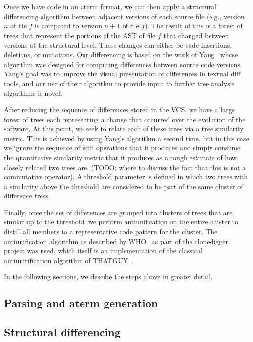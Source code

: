 \documentclass{acm_proc_article-sp}
\begin{document}
Once we have code in an aterm format, we can then apply a structural
differencing algorithm between adjacent versions of each source file (e.g.,
version $n$ of file $f$ is compared to version $n+1$ of file $f$).  The result
of this is a forest of trees that represent the portions of the AST of file
$f$ that changed between versions at the structural level.  These changes can
either be code insertions, deletions, or mutations.  Our differencing is based
on the work of Yang~\cite{yang91diff} whose algorithm was designed for computing
differences between source code versions.  Yang's goal was to improve the
visual presentation of differences in textual diff tools, and our use of their
algorithm to provide input to further tree analysis algorithms is novel.

After reducing the sequence of differences stored in the VCS, we have a large
forest of trees each representing a change that occurred over the evolution of
the software.  At this point, we seek to relate each of these trees via a 
tree similarity metric.  This is achieved by using Yang's algorithm a second time,
but in this case we ignore the sequence of edit operations that it produces and
simply consume the quantitative similarity metric that it produces as a rough
estimate of how closely related two trees are.  (TODO: where to discuss the fact that
this is not a commutative operator).  A threshold parameter is defined in which
two trees with a similarity above the threshold are considered to be part of the same
cluster of difference tress.

Finally, once the set of differences are grouped into clusters of trees that
are similar up to the threshold, we perform antiunification on the entire
cluster to distill all members to a representative code pattern for the
cluster.  The antiunification algorithm as described by WHO~\cite{antiu} as
part of the clonedigger project was used, which itself is an implementation of
the classical antiunitification algorithm of THATGUY~\cite{who}.

In the following sections, we descibe the steps above in greater detail.

\subsection{Parsing and aterm generation}

\subsection{Structural differencing}
\end{document}

